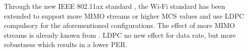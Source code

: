 

Through the new IEEE 802.11ax standard \cite{noauthor_ieee_2021}, the Wi-Fi standard has been extended to support more \ac{MIMO} streams or higher \ac{MCS} values and use \ac{LDPC} compulsory for the
aforementioned configurations. The effect of more \ac{MIMO} streams is already known from \cite{Lot of stuff}.
\ac{LDPC} no new effect for data rate, but more robustness which results in a lower \ac{PER}.